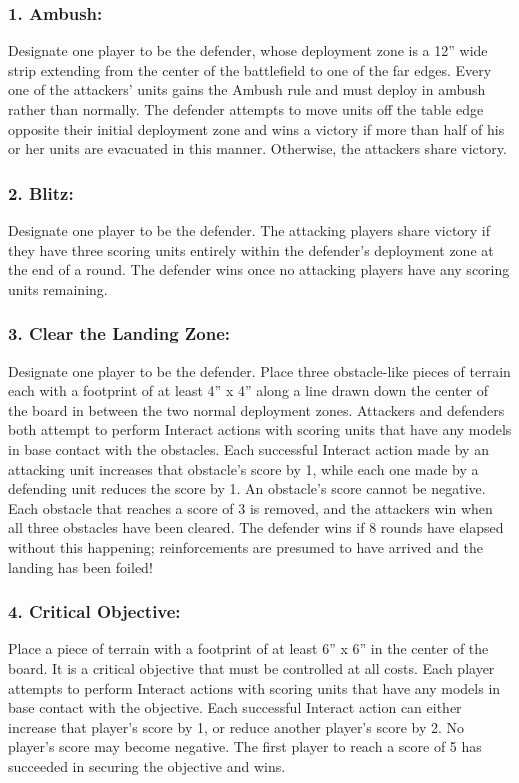 \begin{multicols}{2}
\subsubsection*{1. Ambush:} Designate one player to be the defender, whose deployment zone is a 12'' wide strip extending from the center of the battlefield to one of the far edges. Every one of the attackers' units gains the Ambush rule and must deploy in ambush rather than normally. The defender attempts to move units off the table edge opposite their initial deployment zone and wins a victory if more than half of his or her units are evacuated in this manner. Otherwise, the attackers share victory.

\subsubsection*{2. Blitz:} Designate one player to be the defender. The attacking players share victory if they have three scoring units entirely within the defender's deployment zone at the end of a round. The defender wins once no attacking players have any scoring units remaining.

\subsubsection*{3. Clear the Landing Zone:} Designate one player to be the defender. Place three obstacle-like pieces of terrain each with a footprint of at least 4'' x 4'' along a line drawn down the center of the board in between the two normal deployment zones. Attackers and defenders both attempt to perform Interact actions with scoring units that have any models in base contact with the obstacles. Each successful Interact action made by an attacking unit increases that obstacle's score by 1, while each one made by a defending unit reduces the score by 1. An obstacle's score cannot be negative. Each obstacle that reaches a score of 3 is removed, and the attackers win when all three obstacles have been cleared. The defender wins if 8 rounds have elapsed without this happening; reinforcements are presumed to have arrived and the landing has been foiled!

\subsubsection*{4. Critical Objective:} Place a piece of terrain with a footprint of at least 6'' x 6'' in the center of the board. It is a critical objective that must be controlled at all costs. Each player attempts to perform Interact actions with scoring units that have any models in base contact with the objective. Each successful Interact action can either increase that player's score by 1, or reduce another player's score by 2. No player's score may become negative. The first player to reach a score of 5 has succeeded in securing the objective and wins.


\end{multicols}
